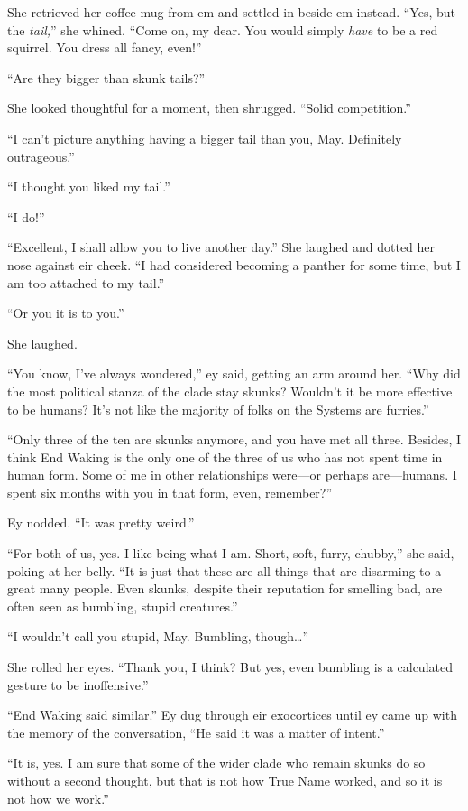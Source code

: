 She retrieved her coffee mug from em and settled in beside em instead. ``Yes, but the \emph{tail,}'' she whined. ``Come on, my dear. You would simply \emph{have} to be a red squirrel. You dress all fancy, even!''

``Are they bigger than skunk tails?''

She looked thoughtful for a moment, then shrugged. ``Solid competition.''

``I can't picture anything having a bigger tail than you, May. Definitely outrageous.''

``I thought you liked my tail.''

``I do!''

``Excellent, I shall allow you to live another day.'' She laughed and dotted her nose against eir cheek. ``I had considered becoming a panther for some time, but I am too attached to my tail.''

``Or you it is to you.''

She laughed.

``You know, I've always wondered,'' ey said, getting an arm around her. ``Why did the most political stanza of the clade stay skunks? Wouldn't it be more effective to be humans? It's not like the majority of folks on the Systems are furries.''

``Only three of the ten are skunks anymore, and you have met all three. Besides, I think End Waking is the only one of the three of us who has not spent time in human form. Some of me in other relationships were—or perhaps are—humans. I spent six months with you in that form, even, remember?''

Ey nodded. ``It was pretty weird.''

``For both of us, yes. I like being what I am. Short, soft, furry, chubby,'' she said, poking at her belly. ``It is just that these are all things that are disarming to a great many people. Even skunks, despite their reputation for smelling bad, are often seen as bumbling, stupid creatures.''

``I wouldn't call you stupid, May. Bumbling, though\ldots{}''

She rolled her eyes. ``Thank you, I think? But yes, even bumbling is a calculated gesture to be inoffensive.''

``End Waking said similar.'' Ey dug through eir exocortices until ey came up with the memory of the conversation, ``He said it was a matter of intent.''

``It is, yes. I am sure that some of the wider clade who remain skunks do so without a second thought, but that is not how True Name worked, and so it is not how we work.''

